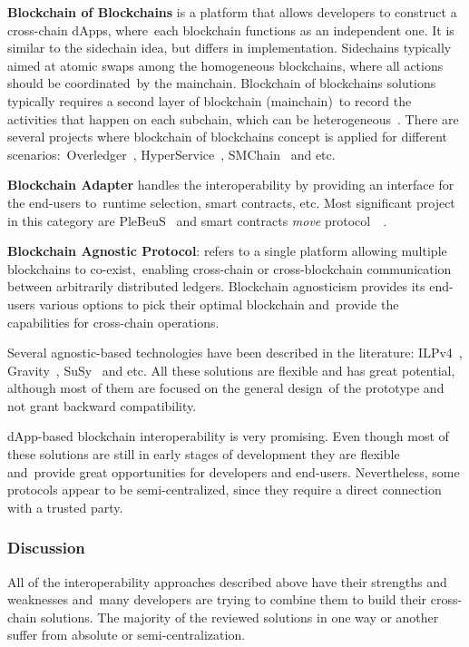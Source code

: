 \textbf{Blockchain of Blockchains} is a platform that allows developers to construct a cross-chain dApps, where\
each blockchain functions as an independent one.
It is similar to the sidechain idea, but differs in implementation.
Sidechains typically aimed at atomic swaps among the homogeneous blockchains, where all actions should be coordinated\
by the mainchain.
Blockchain of blockchains solutions typically requires a second layer of blockchain (mainchain)\
to record the activities that happen on each subchain, which can be heterogeneous~\cite{cryptoeprint:2021/537}.
There are several projects where blockchain of blockchains concept is applied for different scenarios:\
Overledger~\cite{Verdian2018}, HyperService~\cite{Liu2019}, SMChain~\cite{cryptoeprint:2019/1401} and etc.

\textbf{Blockchain Adapter} handles the interoperability by providing an interface for the end-users to\
runtime selection, smart contracts, etc.
Most significant project in this category are PleBeuS~\cite{Scheid2020} and smart contracts \emph{move} protocol\
~\cite{Fynn2020}.

\textbf{Blockchain Agnostic Protocol}: refers to a single platform allowing multiple blockchains to co-exist,\
enabling cross-chain or cross-blockchain communication between arbitrarily distributed ledgers.
Blockchain agnosticism provides its end-users various options to pick their optimal blockchain and\
provide the capabilities for cross-chain operations.

Several agnostic-based technologies have been described in the literature: ILPv4~\cite{InterledgerV4},
Gravity~\cite{PupyshevGravity2020}, SuSy~\cite{PupyshevSuSy2020} and etc.
All these solutions are flexible and has great potential, although most of them are focused on the general design\
of the prototype and not grant backward compatibility.

dApp-based blockchain interoperability is very promising.
Even though most of these solutions are still in early stages of development they are flexible and\
provide great opportunities for developers and end-users.
Nevertheless, some protocols appear to be semi-centralized, since they require a direct connection with a trusted party.

\subsubsection{Discussion}

All of the interoperability approaches described above have their strengths and weaknesses and\
many developers are trying to combine them to build their cross-chain solutions.
The majority of the reviewed solutions in one way or another suffer from absolute or semi-centralization.

